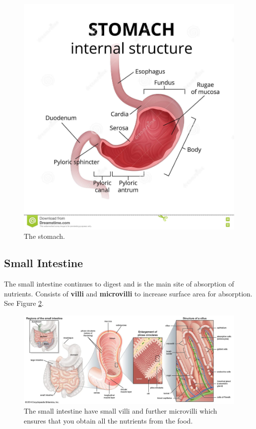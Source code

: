 \documentclass[12pt]{report}
\begin{document}
\begin{figure}[H]
\centering
    \includegraphics[width=\textwidth]{../figures/stomach}
    \caption{The stomach.}
    \label{fig:stomach}
\end{figure}

\subsection{Small Intestine}
\begin{definition}
    The small intestine continues to digest and is the main site of absorption of nutrients. Consists of \textbf{villi} and \textbf{microvilli} to increase surface area for absorption. See Figure \ref{fig:small-intestine}.
\end{definition}

\begin{figure}[H]
\centering
    \includegraphics[width=\textwidth]{../figures/small intestine.jpg}
    \caption{The small intestine have small villi and further microvilli which ensures that you obtain all the nutrients from the food.}
    \label{fig:small-intestine}
\end{figure}
\end{document}
